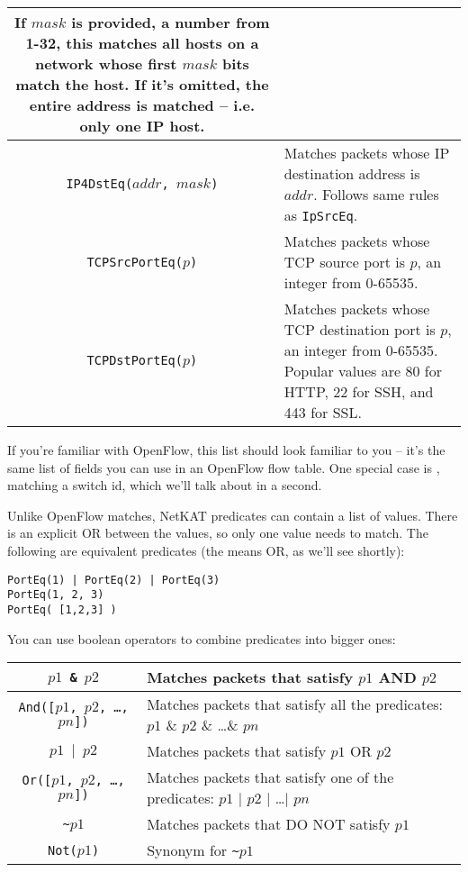 \begin{tabularx}{\linewidth}{|c|X|}
If $mask$ is provided, a number from 1-32, this matches all hosts on a network whose first $mask$ bits match the host.
If it's omitted, the entire address is matched -- i.e. only one IP host.  
\\ \hline
\texttt{IP4DstEq($addr$, $mask$)} & Matches packets whose IP destination address is $addr$.  
Follows same rules as \texttt{IpSrcEq}.
\\ \hline
\texttt{TCPSrcPortEq($p$)} & Matches packets whose TCP source port is $p$, an integer from 0-65535.
\\ \hline
\texttt{TCPDstPortEq($p$)} & Matches packets whose TCP destination port is $p$, an integer from 0-65535.
Popular values are 80 for HTTP, 22 for SSH, and 443 for SSL.  
\\ \hline\hline
\end{tabularx}

\bigskip
If you're familiar with OpenFlow, this list should look familiar to you -- it's the same list of fields you can 
use in an OpenFlow flow table.
One special case is , matching a switch id, which we'll talk about in a second.  

Unlike OpenFlow matches, NetKAT predicates can contain a list of values.  There is an explicit OR between 
the values, so only one value needs to match.  The following are equivalent predicates (the \netkat{|} means
OR, as we'll see shortly):

\begin{verbatim}
PortEq(1) | PortEq(2) | PortEq(3)
PortEq(1, 2, 3)
PortEq( [1,2,3] )
\end{verbatim}

You can use boolean operators to combine predicates into bigger ones:

\bigskip
\begin{tabularx}{\linewidth}{|c|X|}
\hline\hline
\texttt{$p1$ \& $p2$} & Matches packets that satisfy $p1$ AND $p2$
\\ \hline  
\texttt{And([$p1$, $p2$, \ldots, $pn$])} & 
Matches packets that satisfy all the predicates: $p1$ \& $p2$ \& \ldots \& $pn$
\\ \hline  
\texttt{$p1$ $\vert$ $p2$} & Matches packets that satisfy $p1$ OR $p2$
\\ \hline  
\texttt{Or([$p1$, $p2$, \ldots, $pn$])} & 
Matches packets that satisfy one of the predicates: $p1$ $\vert$ $p2$ $\vert$ \ldots $\vert$ $pn$
\\ \hline  
\texttt{\textasciitilde $p1$} & Matches packets that DO NOT satisfy $p1$
\\ \hline  
\texttt{Not($p1$)} & Synonym for \texttt{\textasciitilde $p1$}
\\ \hline\hline
\end{tabularx}

